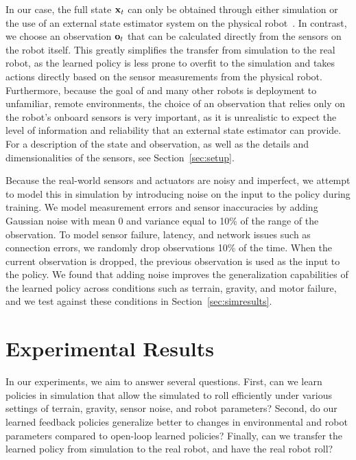 In our case, the full state $\mathbf{x}_t$ can only be obtained through either simulation
or the use of an external state estimator system on the physical \SB{}
robot~\cite{caluwaerts2016esitmation}. In contrast, we choose an observation
$\mathbf{o}_t$ that can be calculated directly from the sensors on the robot itself.
This greatly simplifies the transfer from simulation to the real robot, as the
learned policy is less prone to overfit to the simulation and takes actions
directly based on the sensor measurements from the physical robot. Furthermore,
because the goal of \SB{} and many other robots is deployment to
unfamiliar, remote environments, the choice of an observation that relies only
on the robot's onboard sensors is very important, as it is unrealistic to expect
the level of information and reliability that an external state estimator can
provide. For a description of the state and observation, as well as the details
and dimensionalities of the sensors, see Section~\ref{sec:setup}.

Because the real-world sensors and actuators are noisy and imperfect, we attempt
to model this in simulation by introducing noise on the input to the policy
during training. We model measurement errors and sensor inaccuracies by adding
Gaussian noise with mean 0 and variance equal to 10\% of the range of the
observation. To model sensor failure, latency, and network issues such as
connection errors, we randomly drop observations 10\% of the time. When the
current observation is dropped, the previous observation is used as the input to
the policy. We found that adding noise improves the generalization capabilities
of the learned policy across conditions such as terrain, gravity, and motor
failure, and we test against these conditions in Section~\ref{sec:simresults}.

\section{Experimental Results}
\label{sec:results}

In our experiments, we aim to answer several questions. First, can we learn
policies in simulation that allow the simulated \SB{} to roll efficiently
under
various settings of terrain, gravity, sensor noise, and robot parameters?
Second, do our learned feedback policies generalize better to changes in
environmental and robot parameters compared to open-loop learned policies? 
Finally, can we transfer the learned policy from
simulation to the real robot, and have the real robot roll?

